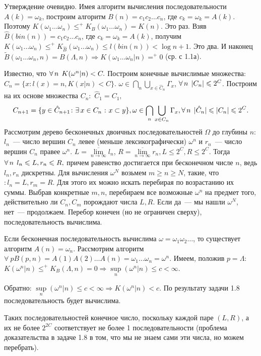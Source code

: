 Утверждение очевидно. Имея алгоритм вычисления последовательности $A(k)=\omega_k$, построим алгоритм $B(n)=c_1c_2\ldots c_n$, где $c_k=\omega_k=A(k)$. Поэтому $K(\omega_1\ldots\omega_n)\le^+K_B(\omega_1\ldots\omega_n)=K(n)$. Это раз. Взяв $\hat B(bin(n))=c_1c_2\ldots c_n$, где $c_k=\omega_k=A(k)$,  получим $K(\omega_1\ldots\omega_n)\le^+K_{\hat B}(\omega_1\ldots\omega_n)\le l(bin(n))<\log n +1$. Это два. И наконец $\tilde B(\omega_1\ldots\omega_n,n)=B(\Lambda,n) \Rightarrow K(\omega_1\ldots\omega_n|n)=^+0$ (ср. с 1.1а).


Известно, что $\forall\,n\:\: K(\omega^n|n)< C.$ Построим конечные вычислимые множества: $\hat C_n = \{x\colon l(x)=n, K(x|n) < C\}.$ $\omega \in \bigcap\limits_n\bigcup\limits_{x\in\hat C_n} \Gamma_x$, $\forall\,n\:\:|C_n| \leqslant 2^C$. Построим на их основе множества $ C_n:$ $\hat C_1 = C_1,$
$$C_{n+1} = \{y\in \hat C_{n+1}\colon\exists\,x\in C_n\:\colon x\subset y\}, \omega \in \bigcap\limits_n\bigcup\limits_{x\in C_n} \Gamma_x, \forall\,n\:\:|\hat C_n|\leqslant|C_n| \leqslant 2^C.$$
Рассмотрим дерево бесконечных двоичных последовательностей $\Omega$ до глубины $n$: $l_n$~--- число вершин $C_n$ левее (меньше лексикографически) $\omega^n$ и $r_n$~--- число вершин $C_n$ правее $\omega^n$. $L=\overline{\lim\limits_{n\rightarrow\infty}} l_n$, $R=\overline{\lim\limits_{n\rightarrow\infty}} r_n, L\le2^C, R\le2^C$. Тогда $\forall\,n\:\: l_n \leqslant L, r_n\leqslant R,$ причем равенство достигается при бесконечном числе $n$, ведь $l_n, r_n$ дискретны. Для вычисления $\omega^N$ возьмем $m\ge n\ge N$,  такие, что $\colon l_n=L, r_m = R$. Для этого их можно искать перебирая по возрастанию их суммы. Выбрав конкретные $m, n$, перебираем все возможные $\omega^n$ на предмет того, действительно ли $C_n, C_m$ порождают числа $L,R$. Если да~--- мы нашли $\omega^N$, нет~--- продолжаем. Перебор конечен (но не ограничен сверху), последовательность вычислима.

Если бесконечная последовательность вычислима $\omega = \omega_1\omega_2\ldots$, то существует алгоритм $A(n)=\omega_n$. Рассмотрим алгоритм $\forall \: p B(p,n)=A(1)A(2)\ldots A(n)=\omega_1\ldots \omega_n=\omega^n$. Имеем, положив $p=\Lambda$: $K(\omega^n|n)\le^+ K_B(\Lambda,n) = 0 \Rightarrow \sup\limits_{n}(\omega^n|n)\le c <\infty$. 

Обратно:  $\sup\limits_{n}(\omega^n|n)\le c <\infty \Rightarrow K(\omega^n|n)<c$. По результату задачи 1.8 последовательность будет вычислима.

Таких последовательностей конечное число, поскольку каждой паре $(L,R)$, а их не более $2^{2C}$ соответствует не более 1 последовательности (проблема доказательства в задаче 1.8 в том, что мы не знаем сами эти числа, но можем перебрать).


